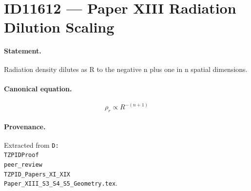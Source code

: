 \section*{ID11612 --- Paper XIII Radiation Dilution Scaling}

\paragraph{Statement.}
Radiation density dilutes as R to the negative n plus one in n spatial dimensions.

\paragraph{Canonical equation.}
\[
\rho_r\propto R^{-(n+1)}
\]

\paragraph{Provenance.}
Extracted from \texttt{D:\\TZPIDProof\\peer\_review\\TZPID\_Papers\_XI\_XIX\\Paper\_XIII\_S3\_S4\_S5\_Geometry.tex}.
